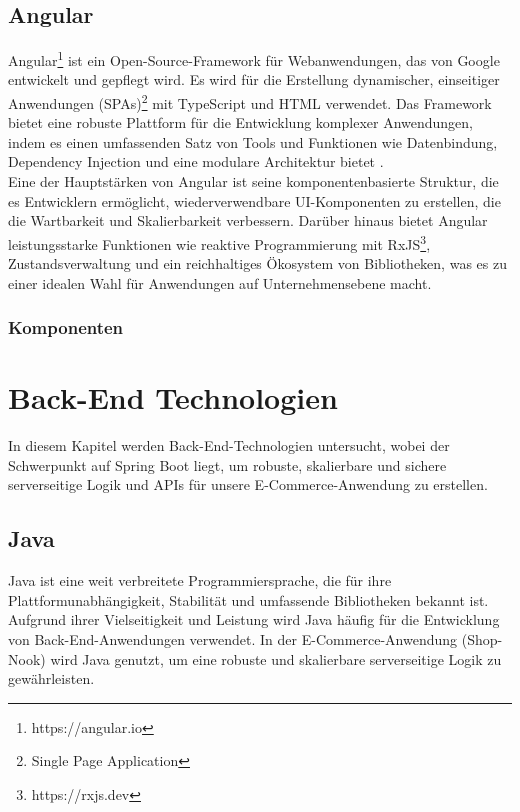 \subsection{Angular}

Angular\footnote{https://angular.io} ist ein Open-Source-Framework für Webanwendungen, das von Google entwickelt und gepflegt wird. Es wird für die Erstellung dynamischer, einseitiger Anwendungen (SPAs)\footnote{Single Page Application} mit TypeScript und HTML verwendet. Das Framework bietet eine robuste Plattform für die Entwicklung komplexer Anwendungen, indem es einen umfassenden Satz von Tools und Funktionen wie Datenbindung, Dependency Injection und eine modulare Architektur bietet \cite{GOOGLE:2024}.\\
Eine der Hauptstärken von Angular ist seine komponentenbasierte Struktur, die es Entwicklern ermöglicht, wiederverwendbare UI-Komponenten zu erstellen, die die Wartbarkeit und Skalierbarkeit verbessern. Darüber hinaus bietet Angular leistungsstarke Funktionen wie reaktive Programmierung mit RxJS\footnote{https://rxjs.dev}, Zustandsverwaltung und ein reichhaltiges Ökosystem von Bibliotheken, was es zu einer idealen Wahl für Anwendungen auf Unternehmensebene macht.

\subsubsection{Komponenten}



\section{Back-End Technologien}

In diesem Kapitel werden Back-End-Technologien untersucht, wobei der Schwerpunkt auf Spring Boot liegt, um robuste, skalierbare und sichere serverseitige Logik und APIs für unsere E-Commerce-Anwendung zu erstellen.

\subsection{Java}

Java ist eine weit verbreitete Programmiersprache, die für ihre Plattformunabhängigkeit, Stabilität und umfassende Bibliotheken bekannt ist. Aufgrund ihrer Vielseitigkeit und Leistung wird Java häufig für die Entwicklung von Back-End-Anwendungen verwendet. In der E-Commerce-Anwendung (Shop-Nook) wird Java genutzt, um eine robuste und skalierbare serverseitige Logik zu gewährleisten.

